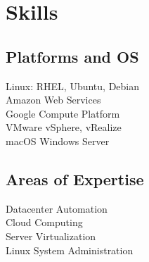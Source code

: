 \documentclass[]{deedy-resume-openfont}
\begin{document}
\begin{minipage}[t]{0.33\textwidth}
\section{Skills}


\subsection{Platforms and OS}
    Linux: RHEL, Ubuntu, Debian\\
    Amazon Web Services \\
    Google Compute Platform\\
    VMware vSphere, vRealize\\
    macOS \textbullet{} Windows Server\\
\sectionsep
    
\subsection{Areas of Expertise}
    Datacenter Automation\\
    Cloud Computing\\
    Server Virtualization\\
    Linux System Administration\\
\end{minipage}
\end{document}
